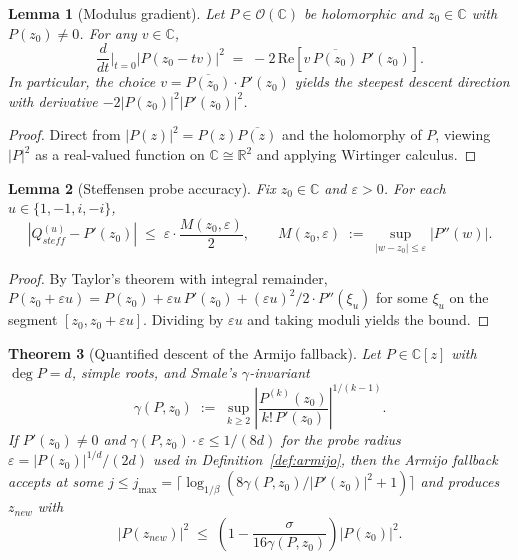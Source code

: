 \documentclass[11pt,a4paper]{article}
\newtheorem{theorem}{Theorem}[section]
\newtheorem{lemma}[theorem]{Lemma}
\begin{document}
\begin{lemma}[Modulus gradient]\label{lem:moduli}
Let $P \in \mathcal{O}(\mathbb{C})$ be holomorphic and $z_0 \in \mathbb{C}$ with $P(z_0) \ne 0$. For any $v \in \mathbb{C}$,
$$ \frac{d}{dt}\bigg|_{t=0} |P(z_0 - tv)|^2 \;=\; -2\,\mathrm{Re}\!\left[v \, \overline{P(z_0)} \, P'(z_0)\right]. $$
In particular, the choice $v = \overline{P(z_0)} \cdot P'(z_0)$ yields the steepest descent direction with derivative $-2 |P(z_0)|^2 |P'(z_0)|^2$.
\end{lemma}
\begin{proof}
Direct from $|P(z)|^2 = P(z)\overline{P(z)}$ and the holomorphy of $P$, viewing $|P|^2$ as a real-valued function on $\mathbb{C} \cong \mathbb{R}^2$ and applying Wirtinger calculus.
\end{proof}

\begin{lemma}[Steffensen probe accuracy]\label{lem:probe}
Fix $z_0 \in \mathbb{C}$ and $\varepsilon > 0$. For each $u \in \{1, -1, i, -i\}$,
$$ \left| Q_{steff}^{(u)} - P'(z_0) \right| \;\le\; \varepsilon \cdot \frac{M(z_0, \varepsilon)}{2}, \qquad M(z_0, \varepsilon) \;:=\; \sup_{|w - z_0| \le \varepsilon} |P''(w)|. $$
\end{lemma}
\begin{proof}
By Taylor's theorem with integral remainder, $P(z_0 + \varepsilon u) = P(z_0) + \varepsilon u\, P'(z_0) + (\varepsilon u)^2 / 2 \cdot P''(\xi_u)$ for some $\xi_u$ on the segment $[z_0, z_0 + \varepsilon u]$. Dividing by $\varepsilon u$ and taking moduli yields the bound.
\end{proof}

\begin{theorem}[Quantified descent of the Armijo fallback]\label{thm:descent}
Let $P \in \mathbb{C}[z]$ with $\deg P = d$, simple roots, and Smale's $\gamma$-invariant
$$ \gamma(P, z_0) \;:=\; \sup_{k \ge 2} \left| \frac{P^{(k)}(z_0)}{k!\, P'(z_0)} \right|^{1/(k-1)}. $$
If $P'(z_0) \ne 0$ and $\gamma(P, z_0) \cdot \varepsilon \le 1/(8d)$ for the probe radius $\varepsilon = |P(z_0)|^{1/d}/(2d)$ used in Definition~\ref{def:armijo}, then the Armijo fallback accepts at some $j \le j_{\max} = \lceil \log_{1/\beta}(8 \gamma(P, z_0) / |P'(z_0)|^2 + 1) \rceil$ and produces $z_{new}$ with
\begin{equation}
|P(z_{new})|^2 \;\le\; \left(1 - \frac{\sigma}{16 \gamma(P, z_0)}\right) |P(z_0)|^2. \label{eq:descent}
\end{equation}
\end{theorem}
\end{document}
